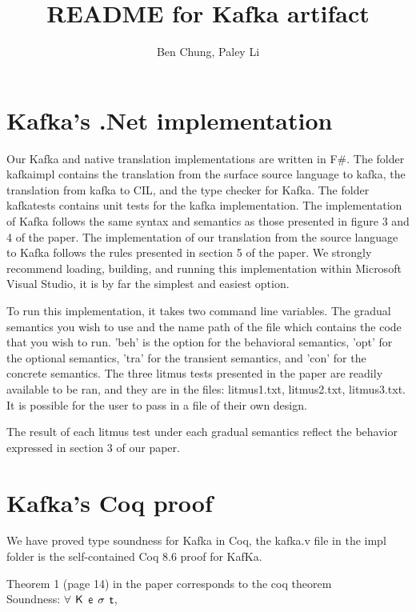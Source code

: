\documentclass[]{article}
\title{README for Kafka artifact}
\author{Ben Chung, Paley Li}
\date{}
\begin{document}
\maketitle

\section{Kafka's .Net implementation}

Our Kafka and native translation implementations are written in F$\#$. The folder kafkaimpl contains the translation from the surface source language to kafka, the translation from kafka to CIL, and the type checker for Kafka. The folder kafkatests contains unit tests for the kafka implementation. The implementation of Kafka follows the same syntax and semantics as those presented in figure 3 and 4 of the paper. The implementation of our translation from the source language to Kafka follows the rules presented in section 5 of the paper. We strongly recommend loading, building, and running this implementation within Microsoft Visual Studio, it is by far the simplest and easiest option. 

To run this implementation, it takes two command line variables. The gradual semantics you wish to use and the name path of the file which contains the code that you wish to run. 'beh' is the option for the behavioral semantics, 'opt' for the optional semantics, 'tra' for the transient semantics, and 'con' for the concrete semantics. The three litmus tests presented in the paper are readily available to be ran, and they are in the files: litmus1.txt, litmus2.txt, litmus3.txt. It is possible for the user to pass in a file of their own design.

The result of each litmus test under each gradual semantics reflect the behavior expressed in section 3 of our paper.


\section{Kafka's Coq proof}

We have proved type soundness for Kafka in Coq, the kafka.v file in the impl folder is the self-contained Coq 8.6 proof for KafKa.

Theorem 1 (page 14) in the paper corresponds to the coq theorem \\

Soundness: $\forall$ ${\sf{K}}$ $\e$ $\sigma$ $\t$,
\end{document}
